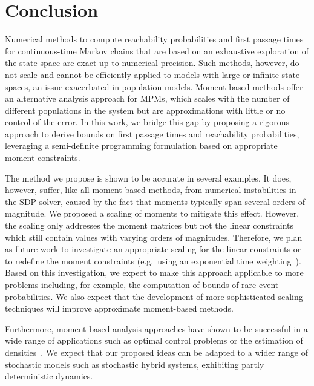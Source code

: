 \section{Conclusion}\label{sec:mfpt:conclusion}
Numerical methods to compute reachability probabilities and first passage times
for continuous-time Markov chains that are based on an exhaustive exploration of the state-space
are exact up to numerical precision. Such methods, however, do not scale and cannot be efficiently applied to models with large or infinite state-spaces,
an issue exacerbated in population models. Moment-based methods offer an alternative analysis approach
for MPMs, which scales with the number of different populations in the system
but are approximations with little or no control of the error.
In this work,
we bridge this gap by proposing a rigorous approach to derive bounds on first passage
times and reachability probabilities, leveraging a semi-definite programming formulation
based on appropriate moment constraints. 

The method we propose is shown to be accurate in several examples. It does, however, suffer, like all moment-based methods, from numerical instabilities in the SDP solver, caused by the fact that moments typically span several orders of magnitude. We proposed a scaling of moments to mitigate this effect. 
However, the scaling only addresses the moment matrices but not the linear constraints
which still contain values with varying orders of magnitudes.
Therefore, we plan as future work to investigate an appropriate scaling for the linear constraints
or to redefine the moment
constraints (e.g.\ using an exponential time weighting~\cite{dowdy2018dynamic}).
Based on this investigation, we expect to make this approach applicable to
more problems including, for example, the computation of bounds of rare event probabilities.
We also expect that the development of more sophisticated scaling techniques will  improve approximate moment-based methods.

Furthermore, moment-based analysis approaches have shown to be successful
in a wide range of applications such as optimal control problems or the estimation
of densities~\cite{lasserre2010moments}.
We expect that our proposed ideas   can be adapted to a wider range
of stochastic models such as stochastic hybrid systems, exhibiting partly deterministic dynamics.

